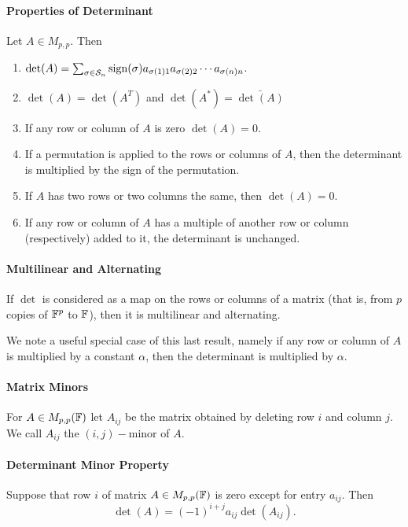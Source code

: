 \paragraph{Properties of Determinant}
Let \(A \in M_{p,p}.\) Then
\begin{enumerate}
    \item \(\det(A) = \sum_{\sigma \in \mathcal{S}_n} \mathrm{sign}(\sigma)a_{\sigma(1)1}a_{\sigma(2)2}\cdots a_{\sigma(n)n}\).
    \item \(\det(A) = \det(A^T)\) and \(\det(A^*) = \bar{\det(A)}\)
    \item If any row or column of \(A\) is zero \(\det(A) = 0\).
    \item If a permutation is applied to the rows or columns of \(A\), then the determinant is multiplied by the sign of the permutation.
    \item If \(A\) has two rows or two columns the same, then \(\det(A) = 0\).
    \item If any row or column of \(A\) has a multiple of another row or column (respectively) added to it, the determinant is unchanged.
\end{enumerate}

\paragraph{Multilinear and Alternating}
If \(\det\) is considered as a map on the rows or columns of a matrix (that is, from \(p\) copies of \(\mathbb{F}^p\) to \(\mathbb{F}\)), then it is multilinear and alternating.

We note a useful special case of this last result, namely if any row or column of \(A\) is multiplied by a constant \(\alpha\), then the determinant is multiplied by \(\alpha\).

\paragraph{Matrix Minors}
For \(A \in M_{p,p}(\mathbb{F})\) let \(A_{ij}\) be the matrix obtained by deleting row \(i\) and column \(j\). We call \(A_{ij}\) the \((i,j)-\)minor of \(A\).

\paragraph{Determinant Minor Property}
Suppose that row \(i\) of matrix \(A \in M_{p,p}(\mathbb{F})\) is zero except for entry \(a_{ij}\). Then \[\det(A) = (-1)^{i+j}a_{ij}\det(A_{ij}).\]

